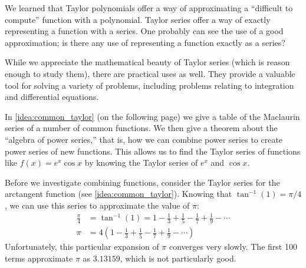 We learned that Taylor polynomials offer a way of approximating a ``difficult to compute'' function with a polynomial. Taylor series offer a way of exactly representing a function with a series. One probably can see the use of a good approximation; is there any use of representing a function exactly as a series?

While we appreciate the mathematical beauty of Taylor series (which is reason enough to study them), there are practical uses as well. They provide a valuable tool for solving a variety of problems, including problems relating to integration and differential equations.

In \autoref{idea:common_taylor} (on the following page) we give  a table of the Maclaurin series of a number of common functions. We then give a theorem about the ``algebra of power series,'' that is, how we can combine power series to create power series of new functions. This allows us to find the Taylor series of functions like $f(x) = e^x\cos x$ by knowing the Taylor series of $e^x$ and $\cos x$.

Before we investigate combining functions, consider the Taylor series for the arctangent function (see \autoref{idea:common_taylor}). Knowing that $\tan^{-1}(1) = \pi/4$, we can use this series to approximate the value of $\pi$:
\begin{align*}
\frac{\pi}4 &= \tan^{-1}(1) = 1-\frac13+\frac15-\frac17+\frac19-\dotsb\\
\pi &= 4\left(1-\frac13+\frac15-\frac17+\frac19-\dotsb\right)
\end{align*} 
Unfortunately, this particular expansion of $\pi$ converges very slowly. The first 
100 terms approximate $\pi$ as $3.13159$, which is not particularly good.

